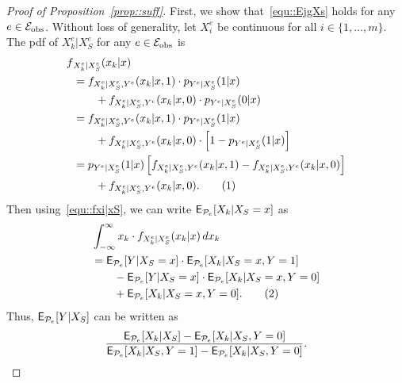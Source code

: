 \documentclass[conference,letterpaper]{IEEEtran}
\newcommand\numberthis{\addtocounter{equation}{1}\tag{\theequation}}
\begin{document}
\appendix
\begin{proof}[Proof of Proposition~\ref{prop::suff}]
    First, we show that~\eqref{equ::EjgXs} holds for any $e\in\mathcal{E}_{\text{obs}}$.  Without loss of generality, let $X^e_i$ be continuous for all $i\in\{1,\dots,m\}$. The pdf of $X_k^e|X_S^e$ for any $e\in\mathcal{E}_{\text{obs}}$ is
\begin{align*}
    f&_{X_k^e|X_S^e}(x_k|x) \\
    &= f_{X_k^e|X_S^e,Y^e}(x_k|x,1)\cdot p_{Y^e|X_S^e}(1|x) \\
    &\qquad + f_{X_k^e|X_S^e,Y^e}(x_k|x,0)\cdot p_{Y^e|X_S^e}(0|x) \\
    &= f_{X_k^e|X_S^e,Y^e}(x_k|x,1)\cdot p_{Y^e|X_S^e}(1|x) \\
    &\qquad +  f_{X_k^e|X_S^e,Y^e}(x_k|x,0)\cdot\left[1-p_{Y^e|X_S^e}(1|x)\right] \\
    & = p_{Y^e|X_S^e}(1|x)\left[f_{X_k^e|X_S^e,Y^e}(x_k|x,1) - f_{X_k^e|X_S^e,Y^e}(x_k|x,0)\right] \\
    &\qquad + f_{X_k^e|X_S^e,Y^e}(x_k|x,0).\numberthis\label{equ::fxi|xS}
\end{align*}
Then using~\eqref{equ::fxi|xS}, we can write $\operatorname{\sf E}_{\mathcal{P}_e}[X_k|X_S=x]$ as
\begin{align*}
     &\int_{-\infty}^{\infty} x_k\cdot f_{X_k^e|X_S^e}(x_k|x) \,dx_k \\
    &= \E_{\Pc_e}[Y|X_S=x]\cdot\E_{\Pc_e}[X_k|X_S=x,Y=1] \\
    &\qquad - \E_{\Pc_e}[Y|X_S=x]\cdot\E_{\Pc_e}[X_k|X_S=x,Y=0] \\
    &\qquad + \E_{\Pc_e}[X_k|X_S=x,Y=0] . \numberthis\label{equ::EXjgXs}
\end{align*}
Thus, $\operatorname{\sf E}_{\mathcal{P}_e}[Y|X_S]$ can be written as
\begin{equation}\label{equ::EjgXs_ther}
     \frac{\E_{\Pc_e}[X_k|X_S] - \E_{\Pc_e}[X_k|X_S,Y=0]}{\E_{\Pc_e}[X_k|X_S,Y=1] - \E_{\Pc_e}[X_k|X_S,Y=0]}.
\end{equation}



\end{proof}
\end{document}
